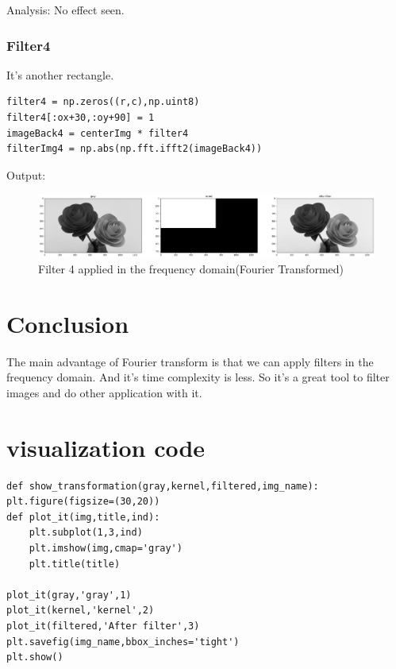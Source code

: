 \documentclass[12pt]{article}
\begin{document}
Analysis: No effect seen.

\clearpage

\subsubsection{Filter4}
It's another rectangle.

\begin{verbatim}
filter4 = np.zeros((r,c),np.uint8)
filter4[:ox+30,:oy+90] = 1
imageBack4 = centerImg * filter4
filterImg4 = np.abs(np.fft.ifft2(imageBack4))
\end{verbatim}

Output:

\begin{figure}[H]
    \centering
    \includegraphics[width=1\textwidth]{assets/kernel4_transform.jpg}
    \caption{Filter 4 applied in the frequency domain(Fourier Transformed)}
    \label{fig:Filter5}
\end{figure}

\clearpage
\section{Conclusion}
The main advantage of Fourier transform is that we can apply filters in the frequency domain. And it's time complexity is less. So it's a great tool to filter images and do other application with it.

\clearpage

\section{visualization code}
\begin{verbatim}
def show_transformation(gray,kernel,filtered,img_name):
plt.figure(figsize=(30,20))
def plot_it(img,title,ind):
    plt.subplot(1,3,ind)
    plt.imshow(img,cmap='gray')
    plt.title(title)
    
plot_it(gray,'gray',1)
plot_it(kernel,'kernel',2)
plot_it(filtered,'After filter',3)
plt.savefig(img_name,bbox_inches='tight')
plt.show()
\end{verbatim}

\listoffigures
\end{document}
